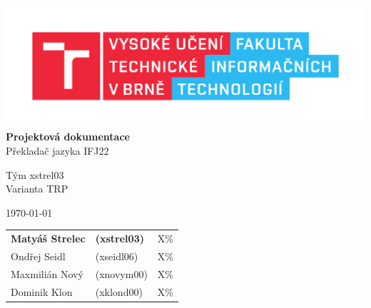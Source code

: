 \documentclass[11pt,a4paper]{article}
\begin{document}
    \begin{titlepage}
        \begin{center}
            \includegraphics[scale=0.65]{include/fit.pdf} \\

            \LARGE{
                \textbf{
                    Projektová dokumentace} \\
                Překladač jazyka IFJ22} \\
                
            \vspace{2cm}
            
            \Large{
                Tým xstrel03 \\
                Varianta TRP \\
            }
                
            \vspace{2cm}
            
            \normalsize{}
            \today{}

            \vspace{2cm}

            \begin{tabular}{l l l}
                \textbf{Matyáš Strelec} & \textbf{(xstrel03)}   & \quad X\% \\
                Ondřej Seidl            & (xseidl06)            & \quad X\% \\
                Maxmilián Nový          & (xnovym00)            & \quad X\% \\
                Dominik Klon            & (xklond00)            & \quad X\% \\
            \end{tabular}
        \end{center}
    \end{titlepage}

    \pagebreak{}

    \tableofcontents

    \pagebreak{}
\end{document}
